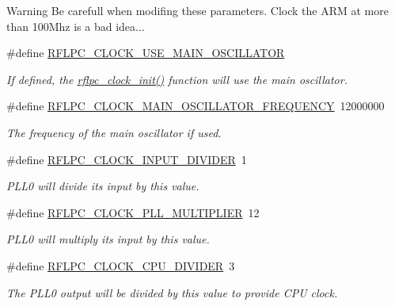\begin{DoxyWarning}{Warning}
Be carefull when modifing these parameters. Clock the A\-R\-M at more than 100\-Mhz is a bad idea... 
\end{DoxyWarning}
\begin{DoxyCompactItemize}
\item 
\#define \hyperlink{group__config_ga613aee18f230b92f06a5c3edf1c0eb8d}{R\-F\-L\-P\-C\-\_\-\-C\-L\-O\-C\-K\-\_\-\-U\-S\-E\-\_\-\-M\-A\-I\-N\-\_\-\-O\-S\-C\-I\-L\-L\-A\-T\-O\-R}
\begin{DoxyCompactList}\small\item\em If defined, the \hyperlink{group__clock_ga00ad4cbad1cd13962e283bdfb3451f7f}{rflpc\-\_\-clock\-\_\-init()} function will use the main oscillator. \end{DoxyCompactList}\item 
\#define \hyperlink{group__config_ga1aca349fddc5e309a59773326d84357e}{R\-F\-L\-P\-C\-\_\-\-C\-L\-O\-C\-K\-\_\-\-M\-A\-I\-N\-\_\-\-O\-S\-C\-I\-L\-L\-A\-T\-O\-R\-\_\-\-F\-R\-E\-Q\-U\-E\-N\-C\-Y}~12000000
\begin{DoxyCompactList}\small\item\em The frequency of the main oscillator if used. \end{DoxyCompactList}\item 
\#define \hyperlink{group__config_ga896b4d9a201a8f3350e8a2827e389edd}{R\-F\-L\-P\-C\-\_\-\-C\-L\-O\-C\-K\-\_\-\-I\-N\-P\-U\-T\-\_\-\-D\-I\-V\-I\-D\-E\-R}~1
\begin{DoxyCompactList}\small\item\em P\-L\-L0 will divide its input by this value. \end{DoxyCompactList}\item 
\#define \hyperlink{group__config_ga512c5ec1b384b35110da196912f42548}{R\-F\-L\-P\-C\-\_\-\-C\-L\-O\-C\-K\-\_\-\-P\-L\-L\-\_\-\-M\-U\-L\-T\-I\-P\-L\-I\-E\-R}~12
\begin{DoxyCompactList}\small\item\em P\-L\-L0 will multiply its input by this value. \end{DoxyCompactList}\item 
\#define \hyperlink{group__config_ga90b12dedcc59811400db87190281f77f}{R\-F\-L\-P\-C\-\_\-\-C\-L\-O\-C\-K\-\_\-\-C\-P\-U\-\_\-\-D\-I\-V\-I\-D\-E\-R}~3
\begin{DoxyCompactList}\small\item\em The P\-L\-L0 output will be divided by this value to provide C\-P\-U clock. \end{DoxyCompactList}\end{DoxyCompactItemize}
